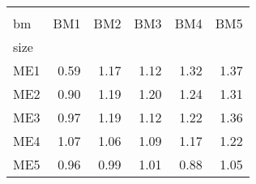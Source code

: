 \begin{tabular}{lrrrrr}
\toprule
{} \\
bm &   BM1 &   BM2 &   BM3 &   BM4 &   BM5 \\
size &       &       &       &       &       \\
\midrule
ME1  &  0.59 &  1.17 &  1.12 &  1.32 &  1.37 \\
ME2  &  0.90 &  1.19 &  1.20 &  1.24 &  1.31 \\
ME3  &  0.97 &  1.19 &  1.12 &  1.22 &  1.36 \\
ME4  &  1.07 &  1.06 &  1.09 &  1.17 &  1.22 \\
ME5  &  0.96 &  0.99 &  1.01 &  0.88 &  1.05 \\
\bottomrule
\end{tabular}
